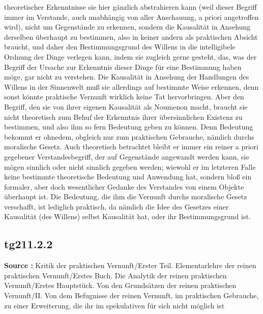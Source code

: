 \documentclass[a4paper,12pt,twoside]{book}
\begin{document}
theoretischer Erkenntnisse sie hier gänzlich abstrahieren kann (weil dieser Begriff immer im Verstande, auch unabhängig von aller Anschauung, a priori angetroffen wird), nicht um Gegenstände zu erkennen, sondern die Kausalität in Ansehung derselben überhaupt zu bestimmen, also in keiner andern als praktischen Absicht braucht, und daher den Bestimmungsgrund des Willens in die intelligibele Ordnung der Dinge verlegen kann, indem sie zugleich gerne gesteht, das, was der Begriff der Ursache zur Erkenntnis dieser Dinge für eine Bestimmung haben möge, gar nicht zu verstehen. Die Kausalität in Ansehung der Handlungen des Willens in der Sinnenwelt muß sie allerdings auf bestimmte Weise erkennen, denn sonst könnte praktische Vernunft wirklich keine Tat hervorbringen. Aber den Begriff, den sie von ihrer eigenen Kausalität als Noumenon macht, braucht sie nicht theoretisch zum Behuf der Erkenntnis ihrer übersinnlichen Existenz zu bestimmen, und also ihm so fern Bedeutung geben zu können. Denn Bedeutung bekommt  er ohnedem, obgleich nur zum praktischen Gebrauche, nämlich durchs moralische Gesetz. Auch theoretisch betrachtet bleibt er immer ein reiner a priori gegebener Verstandesbegriff, der auf Gegenstände angewandt werden kann, sie mögen sinnlich oder nicht sinnlich gegeben werden; wiewohl er im letzteren Falle keine bestimmte theoretische Bedeutung und Anwendung hat, sondern bloß ein formaler, aber doch wesentlicher Gedanke des Verstandes von einem Objekte überhaupt ist. Die Bedeutung, die ihm die Vernunft durchs moralische Gesetz verschafft, ist lediglich praktisch, da nämlich die Idee des Gesetzes einer Kausalität (des Willens) selbst Kausalität hat, oder ihr Bestimmungsgrund ist. 
	
	\subsection*{tg211.2.2} 
	\textbf{Source : }Kritik der praktischen Vernunft/Erster Teil. Elementarlehre der reinen praktischen Vernunft/Erstes Buch. Die Analytik der reinen praktischen Vernunft/Erstes Hauptstück. Von den Grundsätzen der reinen praktischen Vernunft/II. Von dem Befugnisse der reinen Vernunft, im praktischen Gebrauche, zu einer Erweiterung, die ihr im spekulativen für sich nicht möglich ist\\  
	
\end{document}
